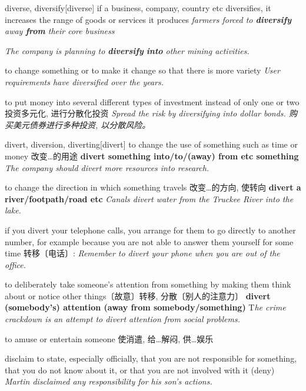 \begin{DefWord}{diverse, diversify}[diverse]
    if a business, company, country etc diversifies, it increases the range of goods or services it produces
    \textit{farmers forced to \textbf{diversify} away \textbf{from} their core business}

    \textit{The company is planning to \textbf{diversify} \textbf{into} other mining activities.}

    to change something or to make it change so that there is more variety
    \textit{User requirements have diversified over the years.}

    to put money into several different types of investment instead of only one or two 投资多元化, 进行分散化投资
    \textit{Spread the risk by diversifying into dollar bonds. 购买美元债券进行多种投资, 以分散风险。 }

\end{DefWord}

\begin{DefWord}{divert, diversion, diverting}[divert]
    to change the use of something such as time or money 改变…的用途
    \textbf{divert something into/to/(away) from etc something}
    \textit{The company should divert more resources into research.}

    to change the direction in which something travels 改变…的方向, 使转向
    \textbf{divert a river/footpath/road etc}
    \textit{Canals divert water from the Truckee River into the lake.}

    if you divert your telephone calls, you arrange for them to go directly to another number, for example because you are not able to answer them yourself for some time 转移〔电话〕:
    \textit{Remember to divert your phone when you are out of the office.}

    to deliberately take someone's attention from something by making them think about or notice other things〔故意〕转移, 分散〔别人的注意力〕
    \textbf{divert (somebody's) attention (away from somebody/something)}
    T\textit{he crime crackdown is an attempt to divert attention from social problems.}
 
    to amuse or entertain someone 使消遣, 给…解闷, 供…娱乐

\end{DefWord}


\begin{DefWord}{disclaim}
    to state, especially officially, that you are not responsible for something, that you do not know about it, or that you are not involved with it (deny)
    \textit{Martin disclaimed any responsibility for his son's actions.}
\end{DefWord}

